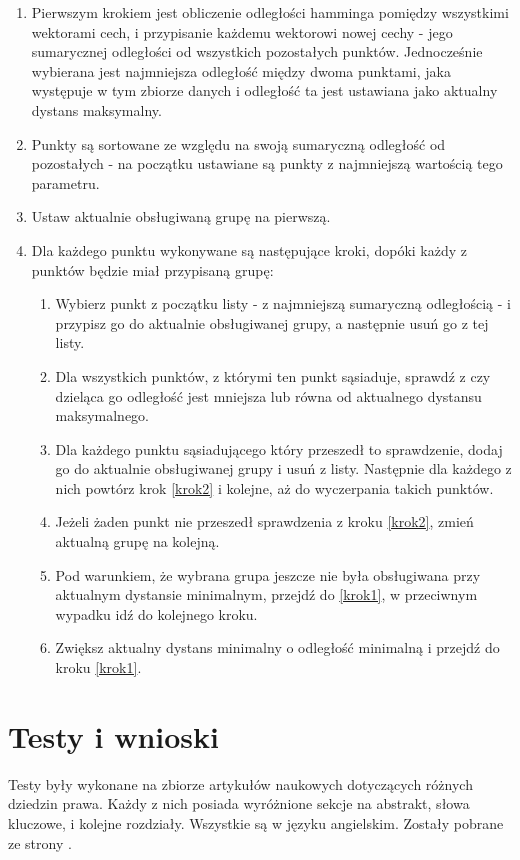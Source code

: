 \documentclass{article}
\begin{document}
\begin{enumerate}
	\item Pierwszym krokiem jest obliczenie odległości hamminga pomiędzy wszystkimi wektorami cech, i przypisanie każdemu wektorowi nowej cechy - jego sumarycznej odległości od wszystkich pozostałych punktów. Jednocześnie wybierana jest najmniejsza odległość między dwoma punktami, jaka występuje w tym zbiorze danych i odległość ta jest ustawiana jako aktualny dystans maksymalny.
	\item Punkty są sortowane ze względu na swoją sumaryczną odległość od pozostałych - na początku ustawiane są punkty z najmniejszą wartością tego parametru.
	\item Ustaw aktualnie obsługiwaną grupę na pierwszą.
	\item Dla każdego punktu wykonywane są następujące kroki, dopóki każdy z punktów będzie miał przypisaną grupę:
	\begin{enumerate}
		\item \label{krok1} Wybierz punkt z początku listy - z najmniejszą sumaryczną odległością - i przypisz go do aktualnie obsługiwanej grupy, a następnie usuń go z tej listy.
		\item \label{krok2} Dla wszystkich punktów, z którymi ten punkt sąsiaduje, sprawdź z czy dzieląca go odległość jest mniejsza lub równa od aktualnego dystansu maksymalnego.
		\item Dla każdego punktu sąsiadującego który przeszedł to sprawdzenie, dodaj go do aktualnie obsługiwanej grupy i usuń z listy. Następnie dla każdego z nich powtórz krok \ref{krok2} i kolejne, aż do wyczerpania takich punktów.
		\item Jeżeli żaden punkt nie przeszedł sprawdzenia z kroku \ref{krok2}, zmień aktualną grupę na kolejną.
		\item Pod warunkiem, że wybrana grupa jeszcze nie była obsługiwana przy aktualnym dystansie minimalnym, przejdź do \ref{krok1}, w przeciwnym wypadku idź do kolejnego kroku.
		\item Zwiększ aktualny dystans minimalny o odległość minimalną i przejdź do kroku \ref{krok1}.
	\end{enumerate}
\end{enumerate}

\newpage
\section{Testy i wnioski}

Testy były wykonane na zbiorze artykułów naukowych dotyczących różnych dziedzin prawa. Każdy z nich posiada wyróżnione sekcje na abstrakt, słowa kluczowe, i kolejne rozdziały. Wszystkie są w języku angielskim. Zostały pobrane ze strony .
\end{document}
